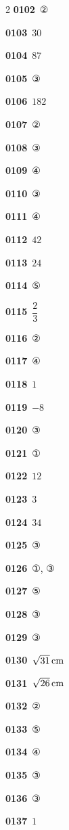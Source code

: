 \documentclass[10pt,a4paper]{article}
\begin{document}
\begin{multicols}{2}
\noindent\textbf{0102}\ ②\par
\noindent\textbf{0103}\ $30$\par
\noindent\textbf{0104}\ $87$\par
\noindent\textbf{0105}\ ③\par
\noindent\textbf{0106}\ $182$\par
\noindent\textbf{0107}\ ②\par
\noindent\textbf{0108}\ ③\par
\noindent\textbf{0109}\ ④\par
\noindent\textbf{0110}\ ③\par
\noindent\textbf{0111}\ ④\par
\noindent\textbf{0112}\ $42$\par
\noindent\textbf{0113}\ $24$\par
\noindent\textbf{0114}\ ⑤\par
\noindent\textbf{0115}\ $\dfrac{2}{3}$\par
\noindent\textbf{0116}\ ②\par
\noindent\textbf{0117}\ ④\par
\noindent\textbf{0118}\ $1$\par
\noindent\textbf{0119}\ $-8$\par
\noindent\textbf{0120}\ ③\par
\noindent\textbf{0121}\ ①\par
\noindent\textbf{0122}\ $12$\par
\noindent\textbf{0123}\ $3$\par
\noindent\textbf{0124}\ $34$\par
\noindent\textbf{0125}\ ③\par
\noindent\textbf{0126}\ ①, ③\par
\noindent\textbf{0127}\ ⑤\par
\noindent\textbf{0128}\ ③\par
\noindent\textbf{0129}\ ③\par
\noindent\textbf{0130}\ $\sqrt{31}\mkern3mu \mathrm{cm}$\par
\noindent\textbf{0131}\ $\sqrt{26}\mkern3mu \mathrm{cm}$\par
\noindent\textbf{0132}\ ②\par
\noindent\textbf{0133}\ ⑤\par
\noindent\textbf{0134}\ ④\par
\noindent\textbf{0135}\ ③\par
\noindent\textbf{0136}\ ③\par
\noindent\textbf{0137}\ $1$\par

\end{multicols}
\end{document}
